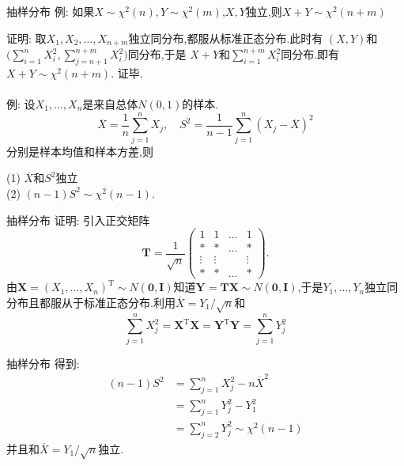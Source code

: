 	\begin{frame}{抽样分布}
		例: 如果$X\sim \chi^2(n),Y\sim \chi^2(m)$,$X,Y$独立,则$X+Y\sim \chi^2(n+m)$
		
		证明: 取$X_1,X_2,\dots,X_{n+m}$独立同分布,都服从标准正态分布.此时有
		$(X,Y)$和$\big(\sum\limits_{i=1}^{n}X_i^2,\sum\limits_{j=n+1}^{n+m}X_i^2 \big)$同分布,于是
		$X+Y$和$\sum\limits_{i=1}^{n+m}X_i^2$同分布.即有$X+Y\sim \chi^2(n+m)$. 证毕.
		\\ \hspace*{\fill} \\
		例: 设$X_1,\dots,X_n$是来自总体$N(0,1)$的样本.
		\begin{equation}
			\overline{X} = \frac{1}{n}\sum_{j=1}^{n}X_j,\quad S^2 = \frac{1}{n-1}\sum_{j=1}^{n}(X_j-\overline{X})^2
		\end{equation}
		分别是样本均值和样本方差,则
		
		(1) $\overline{X}$和$S^2$独立 \\
		(2) $(n-1)S^2\sim \chi^2(n-1)$.
	\end{frame}
	
	\begin{frame}{抽样分布}
		证明: 引入正交矩阵
		\begin{equation}
			\bm{T} = \frac{1}{\sqrt{n}} 
			\begin{pmatrix} 
				1 & 1 & \dots & 1 \\
				* & * & \dots & * \\ 
				\vdots & \vdots & & \vdots \\
				* & * & \dots & * 
			 \end{pmatrix}.
		\end{equation}
		由$\bm{X}=(X_1,\dots,X_n)^{\mathrm{T}}\sim N(\bm{0},\bm{I})$知道$\bm{Y}=\bm{TX}\sim N(\bm{0},\bm{I}) $,于是$Y_1,\dots,Y_n$独立同分布且都服从于标准正态分布.利用$\overline{X}=Y_1/\sqrt{n}$和
		\begin{equation}
			\sum_{j=1}^{n}X_j^2 = \bm{X}^{\mathrm{T}}\bm{X} = \bm{Y}^{\mathrm{T}}\bm{Y} = 	\sum_{j=1}^{n}Y_j^2
		\end{equation}
	\end{frame}
	
	\begin{frame}{抽样分布}
		得到:
		\begin{equation}
			\begin{split}
				(n-1)S^2 &= \sum_{j=1}^{n}X_j^2 - n\overline{X}^2 \\
				&= \sum_{j=1}^{n}Y_j^2 - Y_1^2 \\
				&= \sum_{j=2}^{n}Y_j^2 \sim \chi^2(n-1)
			\end{split}
		\end{equation}
		并且和$\overline{X}=Y_1/\sqrt{n}$独立.
	\end{frame}

